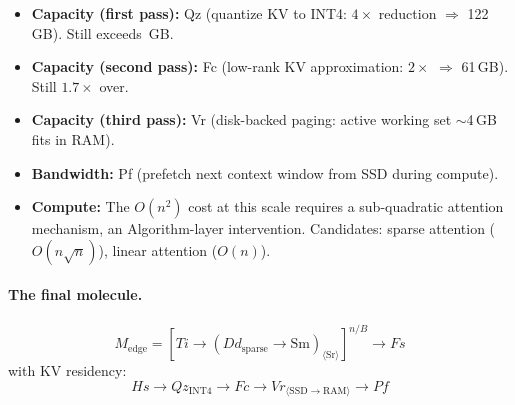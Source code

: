 \documentclass[10pt,twocolumn]{article}
\newcommand{\cvalint}[1]{\pgfmathprintnumber[fixed, precision=0, 1000 sep={\,}]{#1}}
\begin{document}
\begin{itemize}[nosep]
\item \textbf{Capacity (first pass):} Qz (quantize KV to INT4: $4\times$ reduction $\Rightarrow$ 122\,GB). Still exceeds \cvalint{\EdgeRAMGB}\,GB.
\item \textbf{Capacity (second pass):} Fc (low-rank KV approximation: $2\times$ $\Rightarrow$ 61\,GB). Still $1.7\times$ over.
\item \textbf{Capacity (third pass):} Vr (disk-backed paging: active working set $\sim$4\,GB fits in RAM).
\item \textbf{Bandwidth:} Pf (prefetch next context window from SSD during compute).
\item \textbf{Compute:} The $O(n^2)$ cost at this scale requires a sub-quadratic attention mechanism, an Algorithm-layer intervention. Candidates: sparse attention ($O(n \sqrt{n})$), linear attention ($O(n)$).
\end{itemize}

\paragraph{The final molecule.}

\begin{equation*}
M_{\text{edge}} = [Ti \rightarrow (Dd_{\text{sparse}} \rightarrow \text{Sm})_{\langle\text{Sr}\rangle}]^{n/B} \rightarrow Fs
\end{equation*}
with KV residency:
\begin{equation*}
Hs \rightarrow Qz_{\text{INT4}} \rightarrow Fc \rightarrow Vr_{\langle\text{SSD} \to \text{RAM}\rangle} \rightarrow Pf
\end{equation*}
\end{document}
